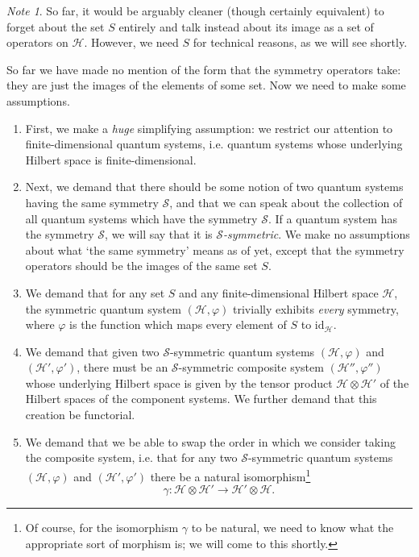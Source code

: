 \documentclass[a4paper,10pt]{scrreprt}
\theoremstyle{definition}
\theoremstyle{plain}
\theoremstyle{remark}
\newtheorem{note}{Note}[section]
\begin{document}
\begin{note}
  So far, it would be arguably cleaner (though certainly equivalent) to forget about the set $S$ entirely and talk instead about its image as a set of operators on $\mathscr{H}$. However, we need $S$ for technical reasons, as we will see shortly.
\end{note}

So far we have made no mention of the form that the symmetry operators take: they are just the images of the elements of some set. Now we need to make some assumptions.

\begin{enumerate}[label=\Roman*.]
  \item First, we make a \emph{huge} simplifying assumption: we restrict our attention to finite-dimensional quantum systems, i.e. quantum systems whose underlying Hilbert space is finite-dimensional. 

  \item Next, we demand that there should be some notion of two quantum systems having the same symmetry $\mathcal{S}$, and that we can speak about the collection of all quantum systems which have the symmetry $\mathcal{S}$. If a quantum system has the symmetry $\mathcal{S}$, we will say that it is \emph{$\mathcal{S}$-symmetric}. We make no assumptions about what `the same symmetry' means as of yet, except that the symmetry operators should be the images of the same set $S$.

  \item We demand that for any set $S$ and any finite-dimensional Hilbert space $\mathscr{H}$, the symmetric quantum system $(\mathscr{H}, \varphi)$ trivially exhibits \emph{every} symmetry, where $\varphi$ is the function which maps every element of $S$ to $\mathrm{id}_{\mathscr{H}}$.

  \item We demand that given two $\mathcal{S}$-symmetric quantum systems $(\mathscr{H}, \varphi)$ and $(\mathscr{H}', \varphi')$, there must be an $\mathcal{S}$-symmetric composite system $(\mathscr{H}'', \varphi'')$ whose underlying Hilbert space is given by the tensor product $\mathscr{H} \otimes \mathscr{H}'$ of the Hilbert spaces of the component systems. We further demand that this creation be functorial.

  \item We demand that we be able to swap the order in which we consider taking the composite system, i.e. that for any two  $\mathcal{S}$-symmetric quantum systems $(\mathscr{H}, \varphi)$ and $(\mathscr{H}', \varphi')$ there be a natural isomorphism\footnote{Of course, for the isomorphism $\gamma$ to be natural, we need to know what the appropriate sort of morphism is; we will come to this shortly.} 
    \begin{equation*}
      \gamma\colon \mathscr{H} \otimes \mathscr{H}' \to \mathscr{H}' \otimes \mathscr{H}.
    \end{equation*}


\end{enumerate}
\end{document}
